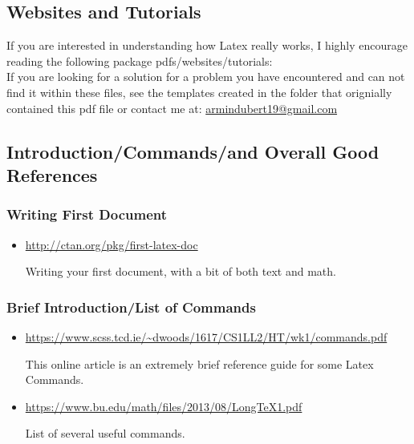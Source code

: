 \documentclass[12pt,hidelinks]{article}
\begin{document}
	\subsection{Websites and Tutorials}
		If you are interested in understanding how Latex really works, I highly encourage reading the following package pdfs/websites/tutorials:\\
		If you are looking for a solution for a problem you have encountered and can not find it within these files, see the templates created in the folder that orignially contained this pdf file or contact me at: \url{armindubert19@gmail.com}
	\subsection{Introduction/Commands/and Overall Good References}
		\subsubsection{Writing First Document}
			\begin{itemize}
				\item \url{http://ctan.org/pkg/first-latex-doc}
					\begin{absquote}
						Writing your first document, with a bit of both text and math.
					\end{absquote}
			\end{itemize}
		\subsubsection{Brief Introduction/List of Commands}
			\begin{itemize}
				\item \url{https://www.scss.tcd.ie/~dwoods/1617/CS1LL2/HT/wk1/commands.pdf}
						\begin{absquote}
							This online article is an extremely brief reference guide for some Latex Commands.
						\end{absquote}
				\item \url{https://www.bu.edu/math/files/2013/08/LongTeX1.pdf}
						\begin{absquote}
							List of several useful commands.
						\end{absquote}
			\end{itemize}
\end{document}
